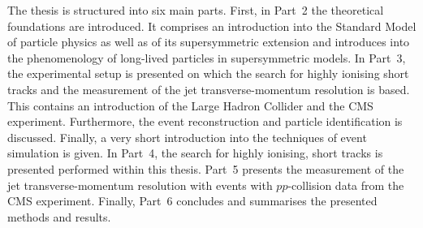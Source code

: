 The thesis is structured into six main parts.
First, in Part~2 the theoretical foundations are introduced.
It comprises an introduction into the Standard Model of particle physics as well as of its supersymmetric extension and introduces into the phenomenology of long-lived particles in supersymmetric models.
In Part~3, the experimental setup is  presented on which the search for highly ionising short tracks and the measurement of the jet transverse-momentum resolution is based.
This contains an introduction of the Large Hadron Collider and the CMS experiment.
Furthermore, the event reconstruction and particle identification is discussed.
Finally, a very short introduction into the techniques of event simulation is given.
In Part~4, the search for highly ionising, short tracks is presented performed within this thesis.
Part~5 presents the measurement of the jet transverse-momentum resolution with \GAMJET events with $pp$-collision data from the CMS experiment.
Finally, Part~6 concludes and summarises the presented methods and results.

